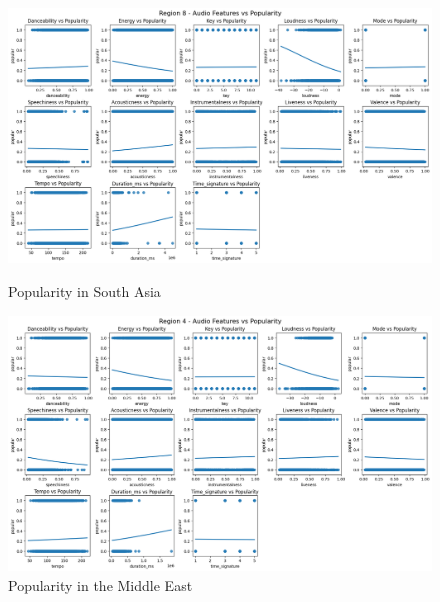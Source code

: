 \begin{figure}[h]
    \begin{minipage}{0.45\textwidth}
        \centering
        \includegraphics[width=\linewidth]{media/region8_cleaned.png}
        \caption{Popularity in South Asia}
        \label{south_asia}
    \end{minipage}%
    \hspace{0.05\textwidth}
    \begin{minipage}{0.45\textwidth}
        \centering
        \includegraphics[width=\linewidth]{media/region4_cleaned.png}
        \caption{Popularity in the Middle East}
        \label{middle_east}
    \end{minipage}
\end{figure}


